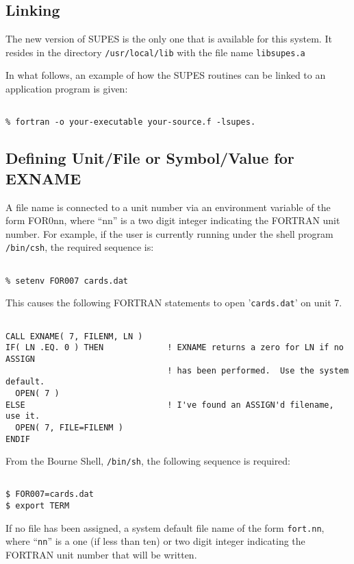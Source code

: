 \subsection{Linking}
The new version of SUPES is the only one that is available for this system.
It resides in the directory \verb+/usr/local/lib+
with the file name \verb+libsupes.a+

In what follows,
an example of how the SUPES routines can be linked to an application program
is given:
\begin{verbatim}

% fortran -o your-executable your-source.f -lsupes.
\end{verbatim}

\subsection{Defining Unit/File or Symbol/Value for EXNAME}
A file name is connected to a unit number via an environment
variable of the form FOR0nn,
where ``nn'' is a two digit integer indicating the FORTRAN unit number. For
example, if the user is currently running under the shell program
\verb+/bin/csh+, the required sequence is:
\begin{verbatim}

% setenv FOR007 cards.dat

\end{verbatim}
This causes the following FORTRAN statements to open '\verb+cards.dat+' on unit 7.
\begin{verbatim}

CALL EXNAME( 7, FILENM, LN )
IF( LN .EQ. 0 ) THEN             ! EXNAME returns a zero for LN if no ASSIGN
                                 ! has been performed.  Use the system default.
  OPEN( 7 )
ELSE                             ! I've found an ASSIGN'd filename, use it.
  OPEN( 7, FILE=FILENM )
ENDIF

\end{verbatim}

From the Bourne Shell,
\verb+/bin/sh+,
the following sequence is required:
\begin{verbatim}

$ FOR007=cards.dat
$ export TERM

\end{verbatim}

If no file has been assigned,
a system default file name of the form \verb+fort.nn+, where ``\verb+nn+''
is a one (if less than
ten) or two digit integer indicating the FORTRAN unit number that will be written.


